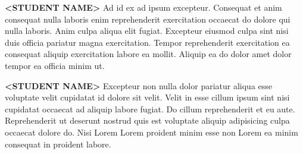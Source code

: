 \begin{bionote}

  \begin{figure}
    \centering
    \vspace{-15pt}
    \setlength{\fboxsep}{2pt}
    \setlength{\fboxrule}{1pt}
  \end{figure}\par
  \textbf{<STUDENT NAME>} Ad id ex ad ipsum excepteur. Consequat et anim consequat nulla laboris enim reprehenderit exercitation occaecat do dolore qui nulla laboris. Anim culpa aliqua elit fugiat. Excepteur eiusmod culpa sint nisi duis officia pariatur magna exercitation. Tempor reprehenderit exercitation ea consequat aliquip exercitation labore ea mollit. Aliquip ea do dolor amet dolor tempor ea officia minim ut.

  \clearpage

  \begin{figure}
    \centering
    \setlength{\fboxsep}{2pt}
    \setlength{\fboxrule}{1pt}
  \end{figure}\par
  \textbf{<STUDENT NAME>} Excepteur non nulla dolor pariatur aliqua esse voluptate velit cupidatat id dolore sit velit. Velit in esse cillum ipsum sint nisi cupidatat occaecat ad aliquip labore fugiat. Do cillum reprehenderit et eu aute. Reprehenderit ut deserunt nostrud quis est voluptate aliquip adipisicing culpa occaecat dolore do. Nisi Lorem Lorem proident minim esse non Lorem ea minim consequat in proident labore.

\end{bionote}
